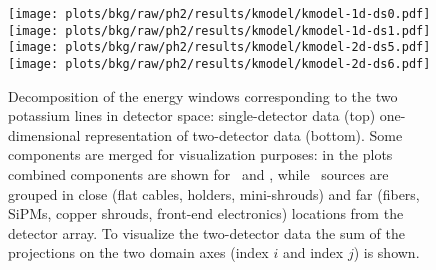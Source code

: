 \begin{figure}
  \centering
  \texttt{[image: plots/bkg/raw/ph2/results/kmodel/kmodel-1d-ds0.pdf]}
  \texttt{[image: plots/bkg/raw/ph2/results/kmodel/kmodel-1d-ds1.pdf]}
  \texttt{[image: plots/bkg/raw/ph2/results/kmodel/kmodel-2d-ds5.pdf]}
  \texttt{[image: plots/bkg/raw/ph2/results/kmodel/kmodel-2d-ds6.pdf]}
  \caption{%
    Decomposition of the energy windows corresponding to the two potassium lines in
    detector space: single-detector data (top) one-dimensional representation of
    two-detector data (bottom). Some components are merged for visualization purposes: in
    the  plots combined components are shown for \kvz\ and \Bih, while \kvn\
    sources are grouped in close (flat cables, holders, mini-shrouds) and far (fibers,
    SiPMs, copper shrouds, front-end electronics) locations from the detector array. To
    visualize the two-detector data the sum of the projections on the two domain axes
    (index $i$ and index $j$) is shown.
  }\label{fig:bkg:raw:ph2:kmodel:base:plotresults}
\end{figure}

\begin{table}
  \centering
  \caption{%
    Summary of the fit parameters estimated with the potassium source tracking analysis
    (base model). The type of prior distribution is indicated with \m{[f]}: flat, \m{[g]}:
    Gaussian. ($\,^{\dagger}$ Tetratex\reg-coated)
  }\label{tab:bkg:raw:ph2:kmodel:base:results}
  
\end{table}

